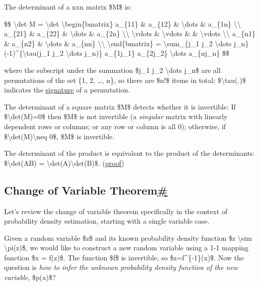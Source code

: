 The determinant of a nxn matrix \$M\$ is:

\$\$ \textbackslash det M = \textbackslash det \textbackslash begin\{bmatrix\} a\_\{11\} \& a\_\{12\} \& \textbackslash dots \& a\_\{1n\} \textbackslash\textbackslash{} a\_\{21\} \& a\_\{22\} \& \textbackslash dots \& a\_\{2n\} \textbackslash\textbackslash{} \textbackslash vdots \& \textbackslash vdots \& \& \textbackslash vdots \textbackslash\textbackslash{} a\_\{n1\} \& a\_\{n2\} \& \textbackslash dots \& a\_\{nn\} \textbackslash\textbackslash{} \textbackslash end\{bmatrix\} = \textbackslash sum\_\{j\_1 j\_2 \textbackslash dots j\_n\} (-1)\^{}\{\textbackslash tau(j\_1 j\_2 \textbackslash dots j\_n)\} a\_\{1j\_1\} a\_\{2j\_2\} \textbackslash dots a\_\{nj\_n\} \$\$

where the subscript under the summation \$j\_1 j\_2 \textbackslash dots j\_n\$ are all permutations of the set \{1, 2, \ldots, n\}, so there are \$n!\$ items in total; \$\textbackslash tau(.)\$ indicates the \href{https://en.wikipedia.org/wiki/Parity_of_a_permutation}{signature} of a permutation.

The determinant of a square matrix \$M\$ detects whether it is invertible: If \$\textbackslash det(M)=0\$ then \$M\$ is not invertible (a \emph{singular} matrix with linearly dependent rows or columns; or any row or column is all 0); otherwise, if \$\textbackslash det(M)\textbackslash neq 0\$, \$M\$ is invertible.

The determinant of the product is equivalent to the product of the determinants: \$\textbackslash det(AB) = \textbackslash det(A)\textbackslash det(B)\$. (\href{https://proofwiki.org/wiki/Determinant_of_Matrix_Product}{proof})

\subsection{\texorpdfstring{Change of Variable Theorem\hyperref[change-of-variable-theorem]{\#}}{Change of Variable Theorem\#}}\label{change-of-variable-theorem}

Let's review the change of variable theorem specifically in the context of probability density estimation, starting with a single variable case.

Given a random variable \$z\$ and its known probability density function \$z \textbackslash sim \textbackslash pi(z)\$, we would like to construct a new random variable using a 1-1 mapping function \$x = f(z)\$. The function \$f\$ is invertible, so \$z=f\^{}\{-1\}(x)\$. Now the question is \emph{how to infer the unknown probability density function of the new variable}, \$p(x)\$?

